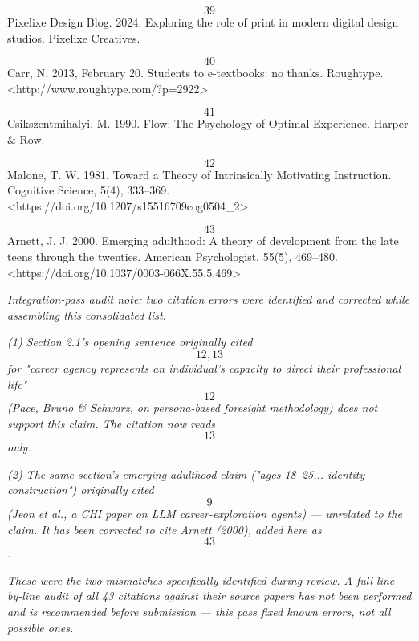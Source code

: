 \textbf{\[39\]} Pixelixe Design Blog. 2024. Exploring the role of print in modern digital design studios. Pixelixe Creatives.

\textbf{\[40\]} Carr, N. 2013, February 20. Students to e-textbooks: no thanks. Roughtype. <http://www.roughtype.com/?p=2922>

\textbf{\[41\]} Csikszentmihalyi, M. 1990. Flow: The Psychology of Optimal Experience. Harper \& Row.

\textbf{\[42\]} Malone, T. W. 1981. Toward a Theory of Intrinsically Motivating Instruction. Cognitive Science, 5(4), 333--369. <https://doi.org/10.1207/s15516709cog0504_2>

\textbf{\[43\]} Arnett, J. J. 2000. Emerging adulthood: A theory of development from the late teens through the twenties. American Psychologist, 55(5), 469--480. <https://doi.org/10.1037/0003-066X.55.5.469>

\emph{Integration-pass audit note: two citation errors were identified and corrected while assembling this consolidated list.}

\emph{(1) Section 2.1's opening sentence originally cited \[12, 13\] for "career agency represents an individual's capacity to direct their professional life" --- \[12\] (Pace, Bruno \& Schwarz, on persona-based foresight methodology) does not support this claim. The citation now reads \[13\] only.}

\emph{(2) The same section's emerging-adulthood claim ("ages 18--25... identity construction") originally cited \[9\] (Jeon et al., a CHI paper on LLM career-exploration agents) --- unrelated to the claim. It has been corrected to cite Arnett (2000), added here as \[43\].}

\emph{These were the two mismatches specifically identified during review. A full line-by-line audit of all 43 citations against their source papers has not been performed and is recommended before submission --- this pass fixed known errors, not all possible ones.}

